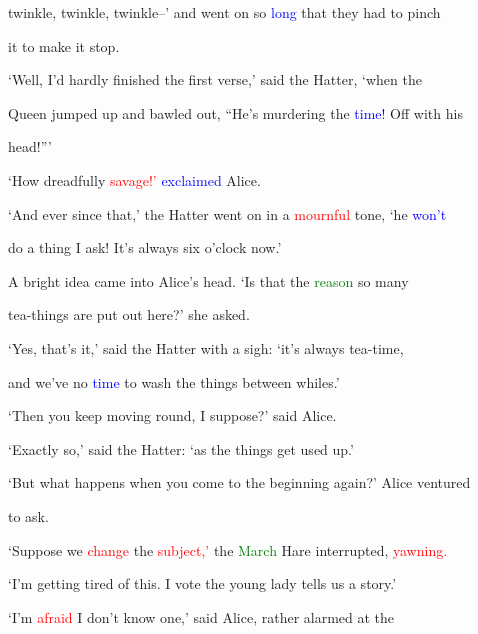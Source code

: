  \textcolor{BurntOrange}{twinkle,} \textcolor{BurntOrange}{twinkle,} \textcolor{BurntOrange}{twinkle--’} and went on so \textcolor{blue}{long} that they had to pinch

 it to make it stop.



 ‘Well, I’d hardly finished the first verse,’ said the Hatter, ‘when the

 Queen jumped up and bawled out, “He’s \textcolor{BurntOrange}{murdering} the \textcolor{blue}{time!} Off with his

 head!”’



 ‘How \textcolor{BurntOrange}{dreadfully} \textcolor{red}{savage!’} \textcolor{blue}{exclaimed} Alice.



 ‘And ever since that,’ the Hatter went on in a \textcolor{red}{mournful} tone, ‘he \textcolor{blue}{won’t}

 do a thing I ask! It’s always six o’clock now.’



 A bright idea came into Alice’s head. ‘Is that the \textcolor{green}{reason} so many

 tea-things are put out here?’ she asked.



 ‘Yes, that’s it,’ said the Hatter with a sigh: ‘it’s always tea-time,

 and we’ve no \textcolor{blue}{time} to wash the things between whiles.’



 ‘Then you keep moving round, I suppose?’ said Alice.



 ‘Exactly so,’ said the Hatter: ‘as the things get used up.’



 ‘But what happens when you come to the beginning again?’ Alice ventured

 to ask.



 ‘Suppose we \textcolor{red}{change} the \textcolor{red}{subject,’} the \textcolor{green}{March} Hare \textcolor{BurntOrange}{interrupted,} \textcolor{red}{yawning.}

 ‘I’m getting tired of this. I \textcolor{BurntOrange}{vote} the \textcolor{BurntOrange}{young} lady tells us a story.’



 ‘I’m \textcolor{red}{afraid} I don’t know one,’ said Alice, rather alarmed at the

